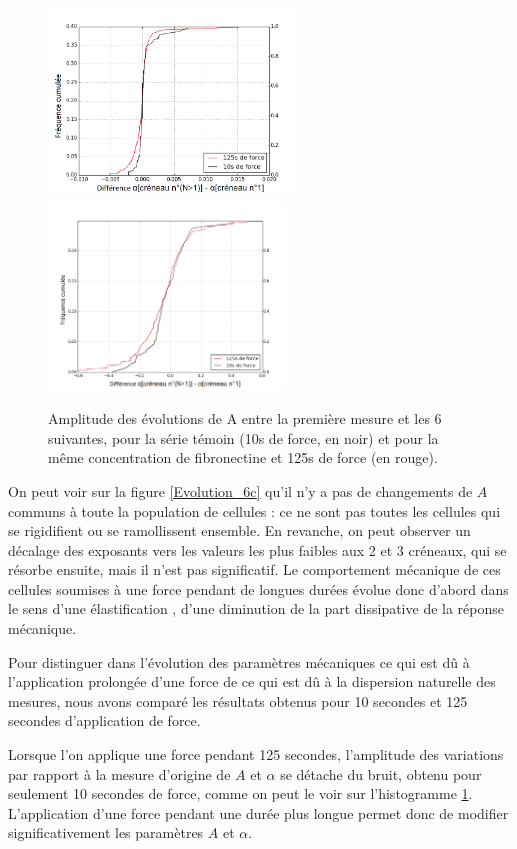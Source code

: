 \begin{figure}
\includegraphics[height=5cm]{Figures/A_diff_seul.png} 
\includegraphics[height=5cm]{Figures/E_diff_seul.png}
\caption{Amplitude des évolutions de A entre la première mesure et les 6 suivantes, pour la série témoin (10s de force, en noir) et pour la même concentration de fibronectine et 125s de force (en rouge).}
\label{Diff}
\end{figure}

On peut voir sur la figure \ref{Evolution_6c} qu'il n'y a pas de changements de $A$ communs à toute la population de cellules : ce ne sont pas toutes les cellules qui se rigidifient ou se ramollissent ensemble. 
En revanche, on peut observer un décalage des exposants vers les valeurs les plus faibles aux 2\ieme{} et 3\ieme{} créneaux, qui se résorbe ensuite, mais il n'est pas significatif. 
Le comportement mécanique de ces cellules soumises à une force pendant de longues durées évolue donc d'abord dans le sens d'une \og élastification \fg , d'une diminution de la part dissipative de la réponse mécanique. 

Pour distinguer dans l’évolution des paramètres mécaniques ce qui est dû à l’application prolongée d’une force de ce qui est dû à la dispersion naturelle des mesures, nous avons comparé les résultats obtenus pour 10 secondes et 125 secondes d’application de force.

Lorsque l'on applique une force pendant 125 secondes, l'amplitude des variations par rapport à la mesure d'origine de $A$ et $\alpha$ se détache du bruit, obtenu pour seulement 10 secondes de force, comme on peut le voir sur l'histogramme \ref{Diff}. L'application d'une force pendant une durée plus longue permet donc de modifier significativement les paramètres $A$ et $\alpha$. 

